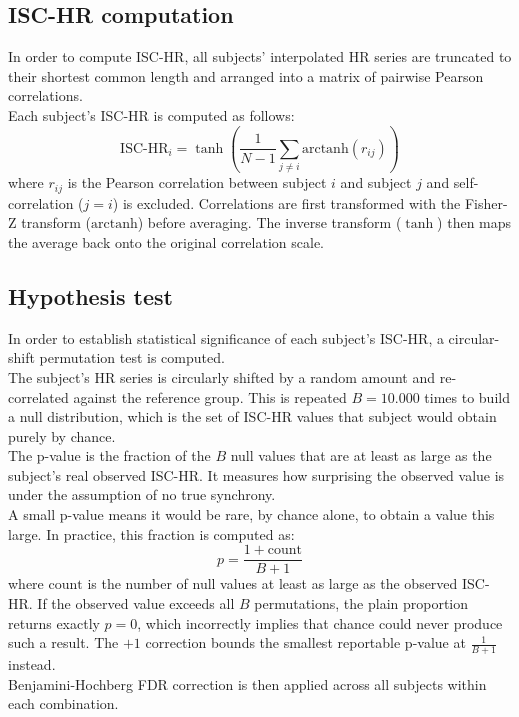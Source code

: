 \documentclass[pdflatex,sn-mathphys-num]{sn-jnl}%
\theoremstyle{thmstyleone}%
\theoremstyle{thmstyletwo}%
\theoremstyle{thmstylethree}%
\begin{document}
\subsection{ISC-HR computation}\label{subsec2}

In order to compute ISC-HR, all subjects' interpolated HR series are truncated to their shortest common length and arranged into a matrix of pairwise Pearson correlations.\\
Each subject's ISC-HR is computed as follows:
\begin{equation}
\text{ISC-HR}_i = \tanh\left(\frac{1}{N-1}\sum_{j \neq i} \text{arctanh}(r_{ij})\right)
\end{equation}
where $r_{ij}$ is the Pearson correlation between subject $i$ and subject $j$ and self-correlation ($j=i$) is excluded. Correlations are first transformed with the Fisher-Z transform ($\text{arctanh}$) before averaging. The inverse transform ($\tanh$) then maps the average back onto the original correlation scale.



\subsection{Hypothesis test}\label{subsec3}

In order to establish statistical significance of each subject's ISC-HR, a circular-shift permutation test is computed.\\
The subject's HR series is circularly shifted by a random amount and re-correlated against the reference group. This is repeated $B=10{.}000$ times to build a null distribution, which is the set of ISC-HR values that subject would obtain purely by chance.\\

The p-value is the fraction of the $B$ null values that are at least as large as the subject's real observed ISC-HR. It measures how surprising the observed value is under the assumption of no true synchrony.\\
A small p-value means it would be rare, by chance alone, to obtain a value this large.
In practice, this fraction is computed as:
\begin{equation}
p = \frac{1 + \text{count}}{B + 1}
\end{equation}
where $\text{count}$ is the number of null values at least as large as the observed ISC-HR. If the observed value exceeds all $B$ permutations, the plain proportion returns exactly $p=0$, which incorrectly implies that chance could never produce such a result. The $+1$ correction bounds the smallest reportable p-value at $\frac{1}{B+1}$ instead.\\
Benjamini-Hochberg FDR correction is then applied across all subjects within each combination.\\
\end{document}
